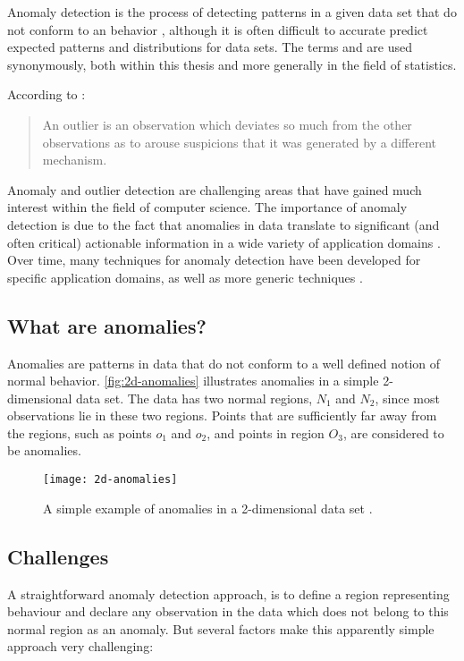 Anomaly detection is the process of detecting patterns in a given data set that 
do not conform to an  behavior \cite{Chandola:2007}, 
although it is often difficult to accurate predict expected patterns and 
distributions for data sets. The terms  and 
 are used synonymously, both within this thesis and more 
generally in the field of statistics.

According to \citeauthor{Hawkins:1980} \cite{Hawkins:1980}:
\begin{quote}
An outlier is an observation which deviates so much from the other observations 
as to arouse suspicions that it was generated by a different mechanism.
\end{quote}

Anomaly and outlier detection are challenging areas that have gained much 
interest within the field of computer science. The importance of anomaly 
detection is due to the fact that anomalies in data translate to significant 
(and often critical) actionable information in a wide variety of application 
domains \cite{Chandola:2007}. Over time, many techniques for anomaly detection 
have been developed for specific application domains, as well as more generic 
techniques \cite{Chandola:2007}.

\subsection{What are anomalies?}
\label{sec:whatAreAnomalies}
Anomalies are patterns in data that do not conform to a well defined notion of
normal behavior. \autoref{fig:2d-anomalies} illustrates anomalies in a simple 
2-dimensional data set. The data has two normal regions, $N_{1}$ and $N_{2}$, 
since most observations lie in these two regions. Points that are sufficiently 
far away from the regions, such as points $o_{1}$ and $o_{2}$, and points in 
region $O_{3}$, are considered to be anomalies.

\begin{figure}
	\centering
	\texttt{[image: 2d-anomalies]}
	\caption[A simple example of anomalies in a 2-dimensional data set.]{A
		simple example of anomalies in a 2-dimensional data set 
		\cite{Chandola:2007}.}
	\label{fig:2d-anomalies}
\end{figure}

\subsection{Challenges}
\label{sec:anomalyDetectionChallenges}
A straightforward anomaly detection approach, is to define a region representing
 behaviour and declare any observation in the data which 
does not belong to this normal region as an anomaly. But several factors make 
this apparently  simple approach very challenging:

